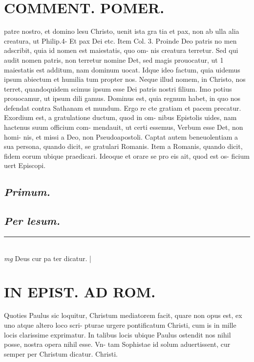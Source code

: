 \documentclass{article}
\begin{document}
\begin{pages}
\section*{COMMENT. POMER.  }\pstart patre nostro, et domino lesu Christo, uenit ista gra tia et pax, non ab ulla alia creatura, ut Philip.4- Et pax Dei etc. Item Col. 3. Proinde Deo patris no men adscribit, quia id nomen est maiestatis, quo om- nis creatura terretur. Sed qui audit nomen patris, non terretur nomine Det, sed magis prouocatur, ut  1  maiestatis est additum, nam dominum uocat. Idque  ideo factum, quia uidemus ipsum abiectum et humilia tum propter nos. Neque illud nomem, in Christo, nos terret, quandoquidem scimus ipsum esse Dei patris nostri filium. Imo potius prouocamur, ut ipsum dili gamus. Dominus est, quia regnum habet, in quo nos defendat contra Sathanam et mundum. Ergo re cte gratiam et pacem precatur.   \pend\pstart Exordium est, a gratulatione ductum, quod in om- nibus Epistolis uides, nam hactenus suum officium com- mendauit, ut certi essemus, Verbum esse Det, non homi- nis, et missi a Deo, non Pseudoapostoli. Captat autem beneuolentiam a sua persona, quando dicit, se gratulari Romanis. Item a Romanis, quando dicit, fidem eorum ubique  praedicari. Ideoque et orare se pro eis ait, quod est os- ficium uert Episcopi.   \pend
{}
{}
\subsection*{\textit{Primum. }}
{}
\subsection*{\textit{Per lesum. }}
\vspace{0.5cm}\noindent
\vspace{0.2cm}\rule{1cm}{0.2pt}\\ 
\hspace{0.2cm}\textit{mg}
\footnotesize Deus cur pa ter dicatur. 
\normalsize| 
\section*{IN EPIST. AD ROM.  }
\marginpar{[ p.]}\pstart Quoties Paulus sic loquitur, Christum mediatorem facit, quare non opus est, ex uno atque altero loco scri- pturae urgere pontificatum Christi, cum is in mille locis clarissime exprimatur. In talibus locis ubique Paulus ostendit nos nihil posse, nostra opera nihil esse. Vn- tam Sophistae id solum aduertissent, cur semper per Christum dicatur. Christi.  \pend
{}
{}

\end{pages}
\end{document}
